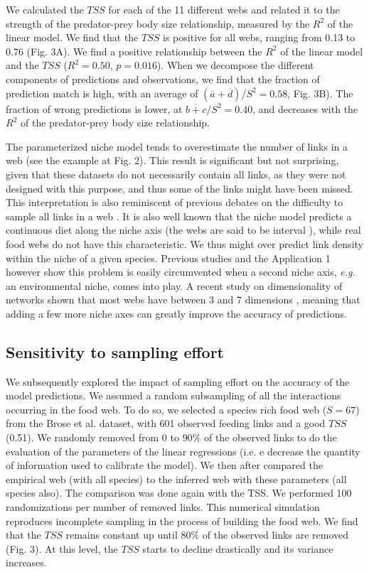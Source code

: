 \documentclass[12pt]{article}
\begin{document}
We calculated the $TSS$ for each of the 11 different webs and related it to the strength of the predator-prey body size relationship, measured by the $R^2$ of the linear model. We find that the $TSS$ is positive for all webs, ranging from 0.13 to 0.76 (Fig. 3A). We find a positive relationship between the $R^2$ of the linear model and the $TSS$ ($R^2=0.50$, $p=0.016$). When we decompose the different components of predictions and observations, we find that the fraction of prediction match is high, with an average of $(\overline{a}+\overline{d})/{S^2}=0.58$, Fig. 3B). The fraction of wrong predictions is lower, at $\overline{b+c}/S^2=0.40$, and decreases with the $R^2$ of the predator-prey body size relationship.  

The parameterized niche model tends to overestimate the number of links in a web (see the example at Fig. 2). This result is significant but not surprising, given that these datasets do not necessarily contain all links, as they were not designed with this purpose, and thus some of the links might have been missed. This interpretation is also reminiscent of previous debates on the difficulty to sample all links in a web \parencite{Martinez1999}. It is also well known that the niche model predicts a continuous diet along the niche axis (the webs are said to be interval \parencite{Cohen1990, Stouffer2006}), while real food webs do not have this characteristic. We thus might over predict link density within the niche of a given species. Previous studies \parencite{Allesina2008} and the Application 1 however show this problem is easily circumvented when a second niche axis, \emph{e.g.} an environmental niche, comes into play. A recent study on dimensionality of networks shown that most webs have between 3 and 7 dimensions \parencite{Eklof2013}, meaning that adding a few more niche axes can greatly improve the accuracy of predictions.

\subsection{Sensitivity to sampling effort}
We subsequently explored the impact of sampling effort on the accuracy of the model predictions. We assumed a random subsampling of all the interactions occurring in the food web. To do so, we selected a species rich food web ($S = 67$) from the Brose et al. dataset, with 601 observed feeding links and a good $TSS$ (0.51). We randomly removed from 0 to $90\%$ of the observed links to do the evaluation of the parameters of the linear regressions (i.e. e decrease the quantity of information used to calibrate the model). We then after compared the empirical web (with all species) to the inferred web with these parameters (all species also). The comparison was done again with the TSS. We performed 100 randomizations per number of removed links. This numerical simulation reproduces incomplete sampling in the process of building the food web. We find that the $TSS$ remains constant up until $80\%$ of the observed links are removed (Fig. 3). At this level, the $TSS$ starts to decline drastically and its variance increases. 
\end{document}
